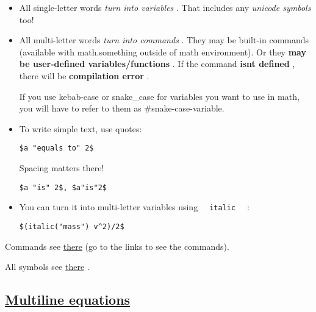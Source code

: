\begin{itemize}
\item
  All single-letter words \emph{turn into variables} . That includes any
  \emph{unicode symbols} too!
\item
  All multi-letter words \emph{turn into commands} . They may be
  built-in commands (available with math.something outside of math
  environment). Or they \textbf{may be user-defined variables/functions}
  . If the command \textbf{isn\textquotesingle t defined} , there will
  be \textbf{compilation error} .

  If you use kebab-case or snake\_case for variables you want to use in
  math, you will have to refer to them as \#snake-case-variable.
\item
  To write simple text, use quotes:

\begin{verbatim}
$a "equals to" 2$
\end{verbatim}

  \pandocbounded{}

  Spacing matters there!

\begin{verbatim}
$a "is" 2$, $a"is"2$
\end{verbatim}

  \pandocbounded{}
\item
  You can turn it into multi-letter variables using
  \texttt{\ }{\texttt{\ italic\ }}\texttt{\ } :

\begin{verbatim}
$(italic("mass") v^2)/2$
\end{verbatim}

  \pandocbounded{}
\end{itemize}

Commands see
\href{https://typst.app/docs/reference/math/\#definitions}{there} (go to
the links to see the commands).

All symbols see
\href{https://typst.app/docs/reference/symbols/sym/}{there} .

\subsection{\texorpdfstring{\hyperref[multiline-equations]{Multiline
equations}}{Multiline equations}}\label{multiline-equations}

